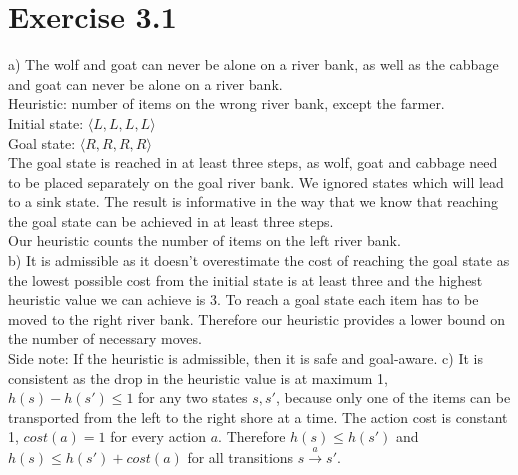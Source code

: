 \documentclass[12pt]{article}
\begin{document}
\section*{Exercise 3.1}
a) The wolf and goat can never be alone on a river bank, as well as the cabbage and goat can never be alone on a river bank.\\ Heuristic: number of items on the wrong river bank, except the farmer.\\
Initial state: $\langle L, L, L, L \rangle$ \\
Goal state: $\langle R, R, R, R \rangle$ \\
The goal state is reached in at least three steps, as wolf, goat and cabbage need to be placed separately on the goal river bank. We ignored states which will lead to a sink state. The result is informative in the way that we know that reaching the goal state can be achieved in at least three steps. \\
Our heuristic counts the number of items on the left river bank. \\
b) It is admissible as it doesn't overestimate the cost of reaching the goal state as the lowest possible cost from the initial state is at least three and the highest heuristic value we can achieve is 3. To reach a goal state each item has to be moved to the right river bank. Therefore our heuristic provides a lower bound on the number of necessary moves. \\Side note: If the heuristic is admissible, then it is safe and goal-aware. \newline
c) It is consistent as the drop in the heuristic value is at maximum 1, $h(s) - h(s') \leq 1$ for any two states $s, s'$, because only one of the items can be transported from the left to the right shore at a time. The action cost is constant 1, $cost(a) = 1$ for every action $a$. Therefore $h(s) \leq h(s')$ and $h(s) \leq h(s') + cost(a)$ for all transitions $s \overset{a}{\rightarrow} s'$.
\end{document}
